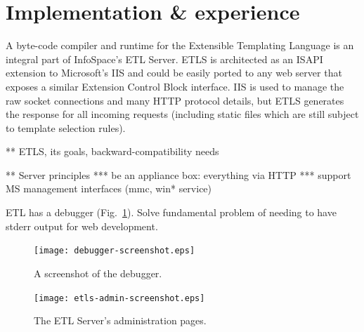 \documentclass{www2003-submission}
\newcommand{\figref}[1]{Fig.~\ref{fig-#1}}
\begin{document}
\section{Implementation \& experience}
\label{sec-implementation}

A byte-code compiler and runtime for the Extensible Templating Language is
an integral part of InfoSpace's ETL Server.  ETLS is architected as an
ISAPI extension to Microsoft's IIS and could be easily ported to any
web server that exposes a similar Extension Control Block interface.
IIS is used to manage the raw socket connections and many HTTP
protocol details, but ETLS generates the response for all incoming
requests (including static files which are still subject to template
selection rules).

** ETLS, its goals, backward-compatibility needs

** Server principles
*** be an appliance box: everything via HTTP
*** support MS management interfaces (mmc, win* service)

ETL has a debugger (\figref{debugger-screenshot}).  Solve fundamental
problem of needing to have stderr output for web development.


\begin{figure}[tb]
\begin{centering}
\hspace*{-0.03\linewidth}\texttt{[image: debugger-screenshot.eps]}
\caption{A screenshot of the debugger.
\label{fig-debugger-screenshot}}
\end{centering}
\end{figure}


\begin{figure}[tb]
\begin{centering}
\hspace*{-0.05\linewidth}\texttt{[image: etls-admin-screenshot.eps]}
\caption{The ETL Server's administration pages.
\label{fig-etls-admin}}
\end{centering}
\end{figure}
\end{document}
